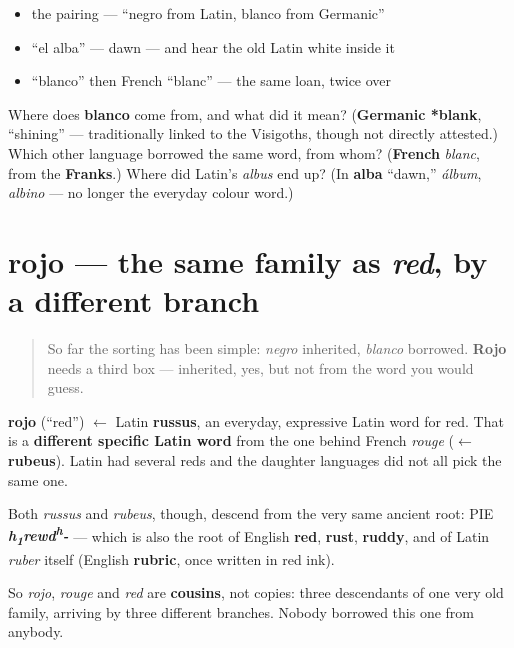 \begin{itemize}
\raggedright
  \item the pairing — \textquotedblleft{}negro from Latin, blanco from Germanic\textquotedblright{}
  \item \textquotedblleft{}el alba\textquotedblright{} — dawn — and hear the old Latin white inside it
  \item \textquotedblleft{}blanco\textquotedblright{} then French \textquotedblleft{}blanc\textquotedblright{} — the same loan, twice over
\end{itemize}

\begin{tcolorbox}[breakable,colback=teal!4,colframe=teal!35!black,title={Before you move on}]
Where does \textbf{blanco} come from, and what did it mean? (\textbf{Germanic *blank}, \textquotedblleft{}shining\textquotedblright{} — traditionally linked to the Visigoths, though not directly attested.) Which other language borrowed the same word, from whom? (\textbf{French} \emph{blanc}, from the \textbf{Franks}.) Where did Latin's \emph{albus} end up? (In \textbf{alba} \textquotedblleft{}dawn,\textquotedblright{} \emph{álbum}, \emph{albino} — no longer the everyday colour word.)
\end{tcolorbox}
\section[rojo]{rojo — the same family as \emph{red}, by a different branch}

\label{lesson:ES-C22-rojo}



\begin{quote}
So far the sorting has been simple: \emph{negro} inherited, \emph{blanco} borrowed. \textbf{Rojo} needs a third box — inherited, yes, but not from the word you would guess.
\end{quote}

\begin{cousinweb}
\textbf{rojo} (\textquotedblleft{}red\textquotedblright{}) $\leftarrow$ Latin \textbf{russus}, an everyday, expressive Latin word for red. That is a \textbf{different specific Latin word} from the one behind French \emph{rouge} ($\leftarrow$ \textbf{rubeus}). Latin had several reds and the daughter languages did not all pick the same one.

Both \emph{russus} and \emph{rubeus}, though, descend from the very same ancient root: PIE \emph{\textbf{h\textsubscript{1}rewd\textsuperscript{h}-}} — which is also the root of English \textbf{red}, \textbf{rust}, \textbf{ruddy}, and of Latin \emph{ruber} itself (English \textbf{rubric}, once written in red ink).

So \emph{rojo}, \emph{rouge} and \emph{red} are \textbf{cousins}, not copies: three descendants of one very old family, arriving by three different branches. Nobody borrowed this one from anybody.
\end{cousinweb}

